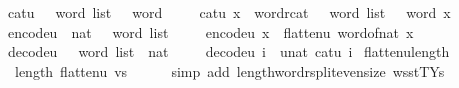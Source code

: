 \begin{isabellebody}
\isanewline
{}\isamarkupfalse%
\ cat{\isacharunderscore}{\kern0pt}u{}{}\ {\isacharcolon}{\kern0pt}{\isacharcolon}{\kern0pt}\ {\isachardoublequoteopen}{}\ word\ list\ {\isasymRightarrow}\ {}{}\ word{\isachardoublequoteclose}\isanewline
\ \ \isanewline
\ \ {\isachardoublequoteopen}cat{\isacharunderscore}{\kern0pt}u{}{}\ x\ {\isasymequiv}\ {\isacharparenleft}{\kern0pt}word{\isacharunderscore}{\kern0pt}rcat\ {\isacharcolon}{\kern0pt}{\isacharcolon}{\kern0pt}\ {}\ word\ list\ {\isasymRightarrow}\ {}{}\ word{\isacharparenright}{\kern0pt}\ x{\isachardoublequoteclose}\isanewline
\isanewline
{}\isamarkupfalse%
\ encode{\isacharunderscore}{\kern0pt}u{}{}\ {\isacharcolon}{\kern0pt}{\isacharcolon}{\kern0pt}\ {\isachardoublequoteopen}nat\ {\isasymRightarrow}\ {}\ word\ list{\isachardoublequoteclose}\isanewline
\ \ \isanewline
\ \ {\isachardoublequoteopen}encode{\isacharunderscore}{\kern0pt}u{}{}\ x\ {\isasymequiv}\ flatten{\isacharunderscore}{\kern0pt}u{}{}\ {\isacharparenleft}{\kern0pt}word{\isacharunderscore}{\kern0pt}of{\isacharunderscore}{\kern0pt}nat\ x{\isacharparenright}{\kern0pt}{\isachardoublequoteclose}\isanewline
\isanewline
{}\isamarkupfalse%
\ decode{\isacharunderscore}{\kern0pt}u{}{}\ {\isacharcolon}{\kern0pt}{\isacharcolon}{\kern0pt}\ {\isachardoublequoteopen}{}\ word\ list\ {\isasymRightarrow}\ nat{\isachardoublequoteclose}\isanewline
\ \ \isanewline
\ \ {\isachardoublequoteopen}decode{\isacharunderscore}{\kern0pt}u{}{}\ i\ {\isasymequiv}\ unat\ {\isacharparenleft}{\kern0pt}cat{\isacharunderscore}{\kern0pt}u{}{}\ i{\isacharparenright}{\kern0pt}{\isachardoublequoteclose}\isanewline
\isanewline
{}\isamarkupfalse%
\ flatten{\isacharunderscore}{\kern0pt}u{}{}{\isacharunderscore}{\kern0pt}length{\isacharcolon}{\kern0pt}\isanewline
\ \ {\isachardoublequoteopen}length\ {\isacharparenleft}{\kern0pt}flatten{\isacharunderscore}{\kern0pt}u{}{}\ vs{\isacharparenright}{\kern0pt}\ {\isacharequal}{\kern0pt}\ {}{\isachardoublequoteclose}\isanewline
%
\isadelimproof
\ \ %
\endisadelimproof
%
\isatagproof
{}\isamarkupfalse%
\ {\isacharparenleft}{\kern0pt}simp\ add{\isacharcolon}{\kern0pt}\ length{\isacharunderscore}{\kern0pt}word{\isacharunderscore}{\kern0pt}rsplit{\isacharunderscore}{\kern0pt}even{\isacharunderscore}{\kern0pt}size\ wsst{\isacharunderscore}{\kern0pt}TYs{\isacharparenleft}{\kern0pt}{}{\isacharparenright}{\kern0pt}{\isacharparenright}{\kern0pt}%

\end{isabellebody}
